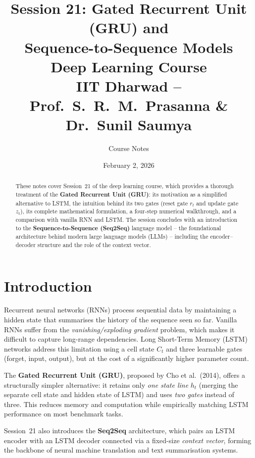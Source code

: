 \documentclass[12pt,a4paper]{article}
\title{\textbf{Session 21: Gated Recurrent Unit (GRU) and\\
Sequence-to-Sequence Models}\\[0.5em]
\large Deep Learning Course\\
\normalsize IIT Dharwad -- Prof.\ S.\ R.\ M.\ Prasanna \& Dr.\ Sunil Saumya}
\author{Course Notes}
\date{February 2, 2026}
\begin{document}
\maketitle
\thispagestyle{fancy}

\begin{abstract}
These notes cover Session~21 of the deep learning course, which provides a thorough treatment of the
\textbf{Gated Recurrent Unit (GRU)}: its motivation as a simplified alternative to LSTM, the intuition
behind its two gates (reset gate $r_t$ and update gate $z_t$), its complete mathematical formulation,
a four-step numerical walkthrough, and a comparison with vanilla RNN and LSTM. The session concludes
with an introduction to the \textbf{Sequence-to-Sequence (Seq2Seq)} language model -- the foundational
architecture behind modern large language models (LLMs) -- including the encoder--decoder structure
and the role of the context vector.
\end{abstract}

\tableofcontents
\newpage

\section{Introduction}
\label{sec:intro}

Recurrent neural networks (RNNs) process sequential data by maintaining a hidden state that summarises
the history of the sequence seen so far.  Vanilla RNNs suffer from the \emph{vanishing/exploding
gradient} problem, which makes it difficult to capture long-range dependencies.  Long Short-Term Memory
(LSTM) networks address this limitation using a cell state $C_t$ and three learnable gates (forget,
input, output), but at the cost of a significantly higher parameter count.

The \textbf{Gated Recurrent Unit (GRU)}, proposed by Cho et al.\ (2014), offers a structurally simpler
alternative: it retains only \emph{one state line} $h_t$ (merging the separate cell state and hidden
state of LSTM) and uses \emph{two gates} instead of three.  This reduces memory and computation while
empirically matching LSTM performance on most benchmark tasks.

Session~21 also introduces the \textbf{Seq2Seq} architecture, which pairs an LSTM encoder with an LSTM
decoder connected via a fixed-size \emph{context vector}, forming the backbone of neural machine
translation and text summarisation systems.
\end{document}
